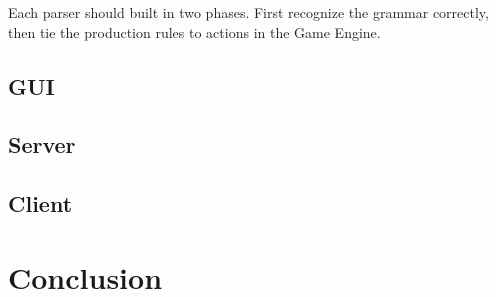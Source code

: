 \documentclass{article}
\begin{document}
Each parser should built in two phases. First recognize the grammar correctly, then 
tie the production rules to actions in the Game Engine.


\subsection{GUI}
\subsection{Server}
\subsection{Client}



\section{Conclusion} %
\end{document}
